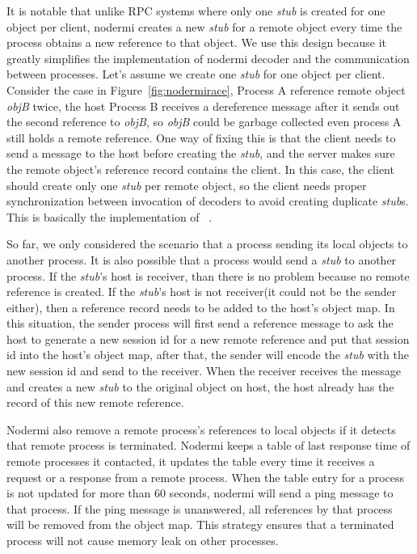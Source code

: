 It is notable that 
unlike RPC systems 
where only one \emph{stub} is created for one object per client,
nodermi creates a new \emph{stub} for a remote object every time
the process obtains a new reference to that object.
We use this design because it
greatly simplifies the implementation of nodermi decoder and
the communication between processes.
Let's assume we create one \emph{stub} for one object per client.
Consider the case in Figure~\ref{fig:nodermirace},
Process A reference remote object \emph{objB} twice,
the host Process B receives a dereference message
after it sends out the second reference to \emph{objB},
so \emph{objB} could be garbage collected even process A still holds a remote
reference.
One way of fixing this is that
the client needs to send a message to the host before creating the \emph{stub},
and the server makes sure the remote object's reference record contains the client.
In this case, the client should create only one \emph{stub} per remote object,
so the client needs proper synchronization between invocation of decoders to
avoid creating duplicate \emph{stub}s. This is basically the implementation
of ~\cite{birrell1993distributed}. %


So far, we only considered the scenario that a process sending its local
objects to another process.
It is also possible that a process would send a \emph{stub} to another process.
If the \emph{stub}'s host is receiver, than there is no problem because no remote
reference is created.
If the \emph{stub}'s host is not receiver(it could not be the sender either),
then 
a reference record needs to be added to the host's object map.
In this situation,
the sender process will first send a reference message to 
ask the host
to generate a new session id for a new remote reference
and put that session id into the host's object map,
after that, 
the sender will encode the \emph{stub} with the new session id
and send to the receiver.
When the receiver receives the message and
creates a new \emph{stub} to the original object on host,
the host already has the record of this new remote reference.


Nodermi also remove a remote process's references to local objects if
it detects that remote process is terminated.
Nodermi keeps a table of last response time of remote processes it contacted,
it updates the table every time it receives a request or a response from a remote 
process. 
When the table entry for a process is not updated for more than 60 seconds, nodermi
will send a ping message to that process.
If the ping message is unanswered, all references by that process will be removed
from the object map.
This strategy ensures that a terminated process will not cause memory leak on
other processes.







